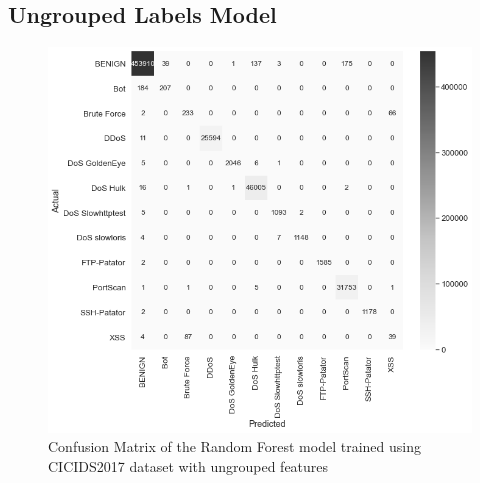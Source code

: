 \subsection{Ungrouped Labels Model}
\label{subsec:ungrouped-training}

\begin{figure}[h!]
   \centering
   \includegraphics[scale=0.62]{assets/figures/chapter3/ungrouped_confusion_matrix.png}
   \caption{Confusion Matrix of the Random Forest model trained using CICIDS2017 dataset with ungrouped features}
   \label{fig:ungrouped-confusion-matrix}
\end{figure}

